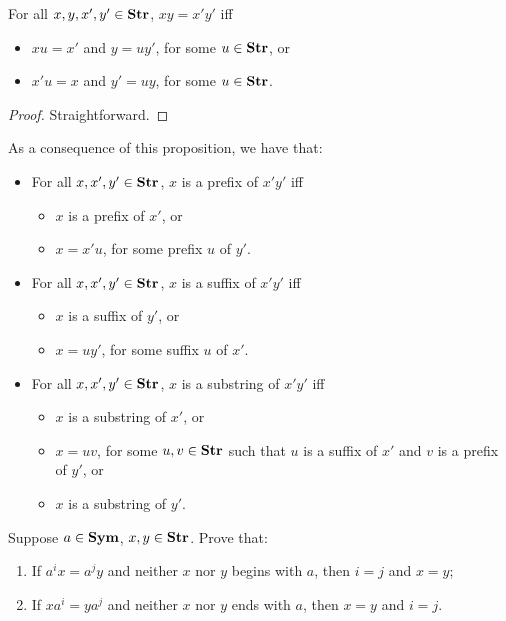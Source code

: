 \begin{proposition}
For all $x,y,x',y'\in\mathbf{Str}$, $xy=x'y'$ iff
\begin{itemize}
\item $xu=x'$ and $y=uy'$, for some $u\in\mathbf{Str}$, or

\item $x'u=x$ and $y'=uy$, for some $u\in\mathbf{Str}$.
\end{itemize}
\end{proposition}

\begin{proof}
Straightforward.
\end{proof}

As a consequence of this proposition, we have that:
\begin{itemize}
\item For all $x,x',y'\in\mathbf{Str}$, $x$ is a prefix of $x'y'$ iff
\begin{itemize}
\item $x$ is a prefix of $x'$, or

\item $x=x'u$, for some prefix $u$ of $y'$.
\end{itemize}

\item For all $x,x',y'\in\mathbf{Str}$, $x$ is a suffix of $x'y'$ iff
\begin{itemize}
\item $x$ is a suffix of $y'$, or

\item $x=uy'$, for some suffix $u$ of $x'$.
\end{itemize}

\item For all $x,x',y'\in\mathbf{Str}$, $x$ is a substring of $x'y'$ iff
\begin{itemize}
\item $x$ is a substring of $x'$, or

\item $x=uv$, for some $u,v\in\mathbf{Str}$ such that
  $u$ is a suffix of $x'$ and $v$ is a prefix of $y'$, or

\item $x$ is a substring of $y'$.
\end{itemize}
\end{itemize}

\begin{exercise}
Suppose $a\in\mathbf{Sym}$, $x,y\in\mathbf{Str}$. Prove that:
\begin{enumerate}[(1)]
\item If $a^ix = a^jy$ and neither $x$ nor $y$ begins with $a$,
then $i=j$ and $x=y$;

\item If $xa^i = ya^j$ and neither $x$ nor $y$ ends with $a$,
then $x=y$ and $i=j$.
\end{enumerate}
\end{exercise}

